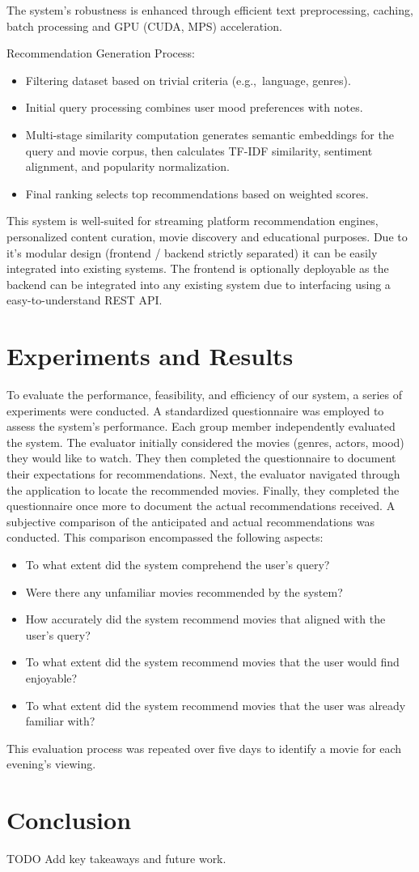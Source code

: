 \documentclass[12pt,a4paper]{article}
\begin{document}
  \noindent The system’s robustness is enhanced through efficient text preprocessing, caching, batch processing and
  GPU (CUDA, MPS) acceleration.

  \noindent Recommendation Generation Process:
  \begin{itemize}
    \item Filtering dataset based on trivial criteria (e.g.,\ language, genres).
    \item Initial query processing combines user mood preferences with notes.
    \item Multi-stage similarity computation generates semantic embeddings for the query and movie corpus, then calculates TF-IDF similarity, sentiment alignment, and popularity normalization.
    \item Final ranking selects top recommendations based on weighted scores.
  \end{itemize}

  \noindent This system is well-suited for streaming platform recommendation engines, personalized content curation, movie discovery
  and educational purposes.
  Due to it's modular design (frontend / backend strictly separated) it can be easily integrated into existing systems.
  The frontend is optionally deployable as the backend can be integrated into any existing system due to interfacing
  using a easy-to-understand REST API.


  \section{Experiments and Results}

  To evaluate the performance, feasibility, and efficiency of our system, a series of experiments were conducted.
  A standardized questionnaire was employed to assess the system’s performance. Each group member independently evaluated
  the system.
  The evaluator initially considered the movies (genres, actors, mood) they would like to watch. They then completed the
  questionnaire to document their expectations for recommendations.
  Next, the evaluator navigated through the application to locate the recommended movies. Finally, they completed the
  questionnaire once more to document the actual recommendations received.
  A subjective comparison of the anticipated and actual recommendations was conducted. This comparison encompassed the
  following aspects:
  \begin{itemize}
    \item To what extent did the system comprehend the user’s query?
    \item Were there any unfamiliar movies recommended by the system?
    \item How accurately did the system recommend movies that aligned with the user’s query?
    \item To what extent did the system recommend movies that the user would find enjoyable?
    \item To what extent did the system recommend movies that the user was already familiar with?
  \end{itemize}

  \noindent This evaluation process was repeated over five days to identify a movie for each evening’s viewing.


  \section{Conclusion}

  TODO Add key takeaways and future work.
\end{document}
